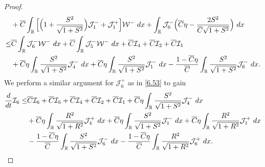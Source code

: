 \documentclass[10pt,a4paper]{amsart}
\newcommand{\fr}{\frac}
\begin{document}
\begin{proof}
\begin{align}
\begin{split}
&+\overline{C}\int_{\mathbb{R}}  \Big[\Big(1+\fr{S^2}{\sqrt{1+S^2}}\Big)\mathcal{J}_{1}^-+\mathcal{J}_{1}^+\Big] \mathcal{W}^-\ {\rm d}x  +\int_{\mathbb{R}}\mathcal{J}_{6}^- \Big(\overline{C}\eta-\fr{2S^2}{\overline{C}\sqrt{1+S^2}}\Big)\ {\rm d}x \\
\leq & \overline{C}\int_{\mathbb{R}}\mathcal{J}_{6}^-\mathcal{W}^-\ {\rm d}x +\overline{C}\int_{\mathbb{R}} \mathcal{J}_{5}^- \mathcal{W}^-\ {\rm d}x + \overline{C} \mathcal{I}_4 +\overline{C} \mathcal{I}_2 +\overline{C} \mathcal{I}_1 \\
&+ \overline{C}\eta\int_{\mathbb{R}} \fr{S^2}{\sqrt{1+S^2}} \mathcal{J}_{4}^-\ {\rm d}x  + \overline{C}\eta\int_{\mathbb{R}} \fr{S^2}{\sqrt{1+S^2}} \mathcal{J}_{1}^-\ {\rm d}x -\fr{1-\overline{C}\eta}{\overline{C}}\int_{\mathbb{R}} \fr{S^2}{\sqrt{1+S^2}}\mathcal{J}_{6}^- \ {\rm d}x.
\end{split}
\end{align}
We perform a similar argument for $\mathcal{J}_{6}^+$ as in \eqref{6.53} to gain
\begin{align}\label{6.54}
\begin{split}
\fr{{\rm d}}{{\rm d}t}\mathcal{I}_6
\leq & \overline{C}\mathcal{I}_6 +\overline{C}\mathcal{I}_5 + \overline{C} \mathcal{I}_4 +\overline{C} \mathcal{I}_2 +\overline{C} \mathcal{I}_1+ \overline{C}\eta\int_{\mathbb{R}} \fr{S^2}{\sqrt{1+S^2}} \mathcal{J}_{4}^-\ {\rm d}x \\
&+ \overline{C}\eta\int_{\mathbb{R}} \fr{R^2}{\sqrt{1+R^2}} \mathcal{J}_{4}^+\ {\rm d}x+ \overline{C}\eta\int_{\mathbb{R}} \fr{S^2}{\sqrt{1+S^2}} \mathcal{J}_{1}^-\ {\rm d}x + \overline{C}\eta\int_{\mathbb{R}} \fr{R^2}{\sqrt{1+R^2}} \mathcal{J}_{1}^+\ {\rm d}x \\ & -\fr{1-\overline{C}\eta}{\overline{C}}\int_{\mathbb{R}} \fr{S^2}{\sqrt{1+S^2}}\mathcal{J}_{6}^- \ {\rm d}x -\fr{1-\overline{C}\eta}{\overline{C}}\int_{\mathbb{R}} \fr{R^2}{\sqrt{1+R^2}}\mathcal{J}_{6}^+ \ {\rm d}x.
\end{split}
\end{align}



\end{proof}
\end{document}
